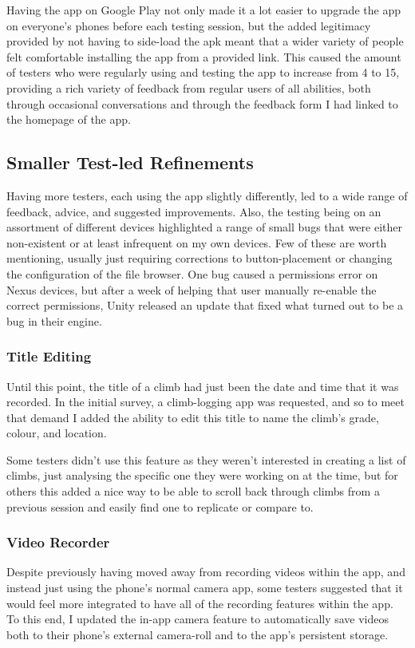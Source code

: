 Having the app on Google Play not only made it a lot easier to upgrade the app on everyone's phones before each testing session, but the added legitimacy provided by not having to side-load the apk meant that a wider variety of people felt comfortable installing the app from a provided link.
This caused the amount of testers who were regularly using and testing the app to increase from 4 to 15, providing a rich variety of feedback from regular users of all abilities, both through occasional conversations and through the feedback form I had linked to the homepage of the app.




\subsection{Smaller Test-led Refinements}
Having more testers, each using the app slightly differently, led to a wide range of feedback, advice, and suggested improvements.
Also, the testing being on an assortment of different devices highlighted a range of small bugs that were either non-existent or at least infrequent on my own devices.
Few of these are worth mentioning, usually just requiring corrections to button-placement or changing the configuration of the file browser.
One bug caused a permissions error on Nexus devices, but after a week of helping that user manually re-enable the correct permissions, Unity released an update that fixed what turned out to be a bug in their engine.

\subsubsection{Title Editing}
Until this point, the title of a climb had just been the date and time that it was recorded.
In the initial survey, a climb-logging app was requested, and so to meet that demand I added the ability to edit this title to name the climb's grade, colour, and location.

Some testers didn't use this feature as they weren't interested in creating a list of climbs, just analysing the specific one they were working on at the time, but for others this added a nice way to be able to scroll back through climbs from a previous session and easily find one to replicate or compare to.


\subsubsection{Video Recorder}
Despite previously having moved away from recording videos within the app, and instead just using the phone's normal camera app, some testers suggested that it would feel more integrated to have all of the recording features within the app.
To this end, I updated the in-app camera feature to automatically save videos both to their phone's external camera-roll and to the app's persistent storage.


